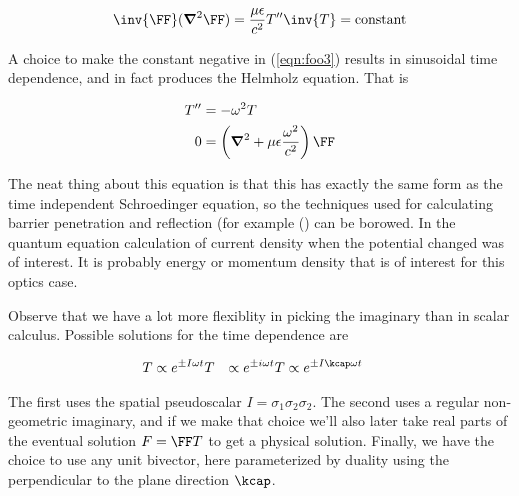 \begin{align}\label{eqn:foo3}
\inv{\FF} (\spacegrad^2 \FF) = \frac{\mu\epsilon}{c^2} T'' \inv{T} = \text{constant}
\end{align}

A choice to make the constant negative in (\ref{eqn:foo3}) results in sinusoidal time dependence, and in fact produces the Helmholz equation.  That is

\begin{align}\label{eqn:foo4}
T'' &= - \omega^2 T \\
  0 &= \left(\spacegrad^2 + \mu\epsilon \frac{\omega^2}{c^2} \right) \FF 
\end{align}

The neat thing about this equation is that this has exactly the same form as the time independent Schroedinger equation, so the techniques used for calculating barrier penetration and reflection (for example (\cite{bohm1989qt}) can be borowed.  In the quantum equation calculation of current density when the potential changed was of interest.  It is probably energy or momentum density that is of interest for this optics case.

Observe that we have a lot more flexiblity in picking the imaginary than in scalar calculus.  Possible solutions for the time dependence are

\begin{align*}
T &\propto e^{\pm I\omega t}
T &\propto e^{\pm i\omega t}
T &\propto e^{\pm I \kcap \omega t}
\end{align*}

The first uses the spatial pseudoscalar $I = \sigma_1 \sigma_2 \sigma_2$.  The second uses a regular non-geometric imaginary, and if we make that choice we'll also later take real parts of the eventual solution $F = \FF T$ to get a physical solution.  Finally, we have the choice to use any unit bivector, here parameterized by duality using the perpendicular to the plane direction $\kcap$.

\EndArticle
